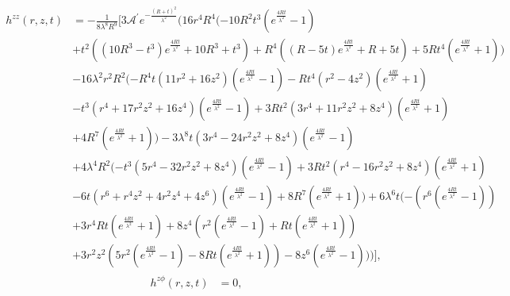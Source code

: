 \begin{align}
\begin{split}
        h^{zz}(r,z,t) &=
-\frac{1}{8 \lambda ^8 R^9}\bigg[3 \mathcal{A}^\prime e^{-\frac{(R+t)^2}{\lambda ^2}} (16 r^4 R^4 (-10 R^2 t^3 (e^{\frac{4 R t}{\lambda ^2}}-1) \\
&+t^2 ((10 R^3-t^3) e^{\frac{4 R t}{\lambda ^2}}+10 R^3+t^3)+R^4 ((R-5 t) e^{\frac{4 R t}{\lambda ^2}}+R+5 t)+5 R t^4 (e^{\frac{4 R t}{\lambda ^2}}+1)) \\
&-16 \lambda ^2 r^2 R^2 (-R^4 t (11 r^2+16 z^2) (e^{\frac{4 R t}{\lambda ^2}}-1)-R t^4 (r^2-4 z^2) (e^{\frac{4 R t}{\lambda ^2}}+1) \\
&-t^3 (r^4+17 r^2 z^2+16 z^4) (e^{\frac{4 R t}{\lambda ^2}}-1)+3 R t^2 (3 r^4+11 r^2 z^2+8 z^4) (e^{\frac{4 R t}{\lambda ^2}}+1) \\
&+4 R^7 (e^{\frac{4 R t}{\lambda ^2}}+1))-3 \lambda ^8 t (3 r^4-24 r^2 z^2+8 z^4) (e^{\frac{4 R t}{\lambda ^2}}-1) \\
&+4 \lambda ^4 R^2 (-t^3 (5 r^4-32 r^2 z^2+8 z^4) (e^{\frac{4 R t}{\lambda ^2}}-1)+3 R t^2 (r^4-16 r^2 z^2+8 z^4) (e^{\frac{4 R t}{\lambda ^2}}+1) \\
&-6 t (r^6+r^4 z^2+4 r^2 z^4+4 z^6) (e^{\frac{4 R t}{\lambda ^2}}-1)+8 R^7 (e^{\frac{4 R t}{\lambda ^2}}+1))+6 \lambda ^6 t (-(r^6 (e^{\frac{4 R t}{\lambda ^2}}-1)) \\
&+3 r^4 R t (e^{\frac{4 R t}{\lambda ^2}}+1)+8 z^4 (r^2 (e^{\frac{4 R t}{\lambda ^2}}-1)+R t (e^{\frac{4 R t}{\lambda ^2}}+1)) \\
&+3 r^2 z^2 (5 r^2 (e^{\frac{4 R t}{\lambda ^2}}-1)-8 R t (e^{\frac{4 R t}{\lambda ^2}}+1))-8 z^6 (e^{\frac{4 R t}{\lambda ^2}}-1)))\bigg],
\end{split}
\end{align}
\begin{align}
        h^{z\phi}(r,z,t) &= 0,
\end{align}
